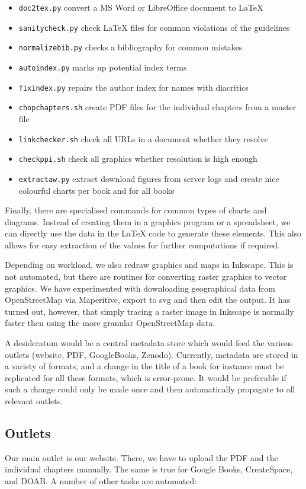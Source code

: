 \documentclass[guidelines,nonflat,modfonts] {langsci/langscibook}
\begin{document}
\begin{itemize}
 \item \texttt{doc2tex.py} convert a MS Word or LibreOffice document to \LaTeX\xspace
 \item \texttt{sanitycheck.py} check \LaTeX\xspace files for common violations of the guidelines
 \item \texttt{normalizebib.py} checks a bibliography for common mistakes 
 \item \texttt{autoindex.py} marks up potential index terms 
 \item \texttt{fixindex.py} repairs the author index for names with diacritics
 \item \texttt{chopchapters.sh} create PDF files for the individual chapters from a master file
 \item \texttt{linkchecker.sh} check all URLs in a document whether they resolve
 \item \texttt{checkppi.sh} check all graphics whether resolution is high enough
 \item \texttt{extractaw.py} extract download figures from server logs and create nice colourful charts per book and for all books
\end{itemize}

Finally, there are specialised commands for common types of charts and diagrams. Instead of creating them in a graphics program or a spreadsheet, we can directly use the data in the \LaTeX\xspace code to generate these elements. This also allows for easy extraction of the values for further computations if required. 

Depending on workload, we also redraw graphics and maps in Inkscape. This is not automated, but there are routines for converting raster graphics to vector graphics. We have experimented with downloading geographical data from OpenStreetMap via Maperitive, export to svg and then edit the output. It has turned out, however, that simply tracing a raster image in Inkscape is normally faster then using the more granular OpenStreetMap data. 

A desideratum would be a central metadata store which would feed the various outlets (website, PDF, GoogleBooks, Zenodo). Currently, metadata are stored in a variety of formats, and a change in the title of a book for instance must be replicated for all these formats, which is error-prone. It would be preferable if such a change could only be made once and then automatically propagate to all relevant outlets.

\subsection{Outlets}
Our main outlet is our website. There, we have to upload the PDF and the individual chapters manually. The same is true for Google Books, CreateSpace, and DOAB. A number of other tasks are automated:
\end{document}
